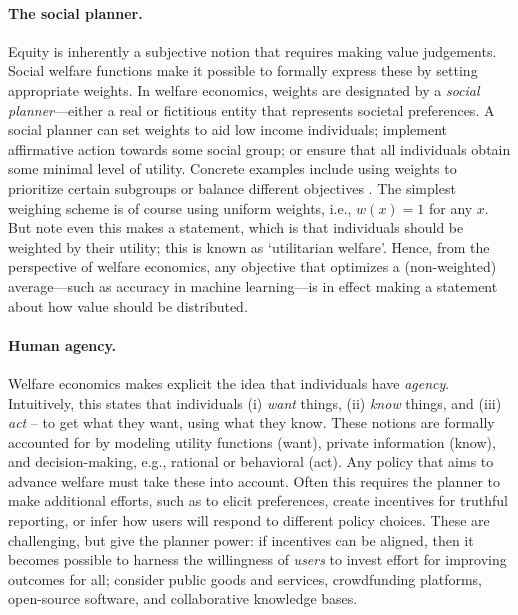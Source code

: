 

\paragraph{The social planner.}
Equity is inherently a subjective notion that requires making value judgements.
Social welfare functions make it possible to formally express these by setting appropriate weights.
In welfare economics, weights are designated by a \emph{social planner}---either a real or fictitious entity that represents societal preferences.
A social planner can set weights to aid low income individuals;
implement affirmative action towards some social group;
or ensure that all individuals obtain some minimal level of utility.
Concrete examples include using weights to prioritize certain subgroups \citep{bjorkegren2022machinelearningpoliciesvalue} or balance different objectives \citep{rolf2020balancing}.
The simplest weighing scheme is of course using uniform weights, i.e., $w(x) = 1$ for any $x$.
But note even this makes a statement, which is that individuals should be weighted by their utility;
this is known as `utilitarian welfare'.
Hence, from the perspective of welfare economics, any objective that optimizes a (non-weighted) average---such as accuracy in machine learning---is in effect making a statement about how value should be distributed.


\paragraph{Human agency.}
Welfare economics makes explicit the idea that individuals have \emph{agency}.
Intuitively, this states that individuals
(i) \emph{want} things,
(ii) \emph{know} things,
and (iii) \emph{act} -- to get what they want, using what they know.
These notions are formally accounted for by modeling
utility functions (want),
private information (know),
and decision-making, e.g., rational or behavioral (act).
Any policy that aims to advance welfare must take these into account.
Often this requires the planner to make additional efforts,
such as to elicit preferences,
create incentives for truthful reporting,
or infer how users will respond to different policy choices.
These are challenging, but give the planner power:
if incentives can be aligned, then it becomes possible
to harness the willingness of \emph{users} to invest effort for improving outcomes for all; consider public goods and services, crowdfunding platforms, open-source software, and collaborative knowledge bases.
\squeeze



